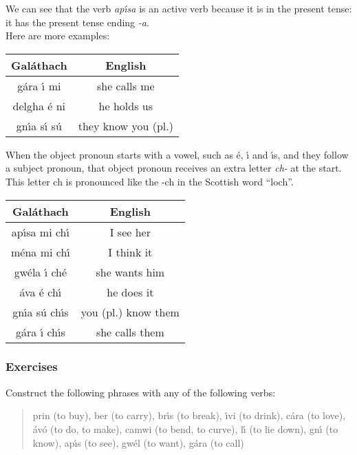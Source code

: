 We can see that the verb \textit{ap\'{\i}sa} is an active verb because it is in the present tense: it has the present tense ending \textit{-a}.\\

Here are more examples:
\begin{table}[H]
\centering
\begin{tabular}{c|c}
  \textbf{Gal\'{a}thach} & \textbf{English}\\
  \toprule
   g\'{a}ra \'{\i} mi & she calls me\\
   delgha \'{e} ni & he holds us\\
   gn\'{\i}a s\'{\i} s\'{u} & they know you (pl.)
\end{tabular}
\label{examples_verbs_vso_more_examples}
\end{table}

When the object pronoun starts with a vowel, such as \'{e}, \'{\i} and \'{\i}s, and they follow a subject pronoun, that object pronoun receives an extra letter \textit{ch-} at the start. This letter ch is pronounced like the -ch in the Scottish word ``loch''.
\begin{table}[H]
\centering
\begin{tabular}{c|c}
  \textbf{Gal\'{a}thach} & \textbf{English}\\
  \toprule
  ap\'{\i}sa mi ch\'{\i} & I see her\\
  m\'{e}na mi ch\'{\i} & I think it\\
  gw\'{e}la \'{\i} ch\'{e} & she wants him\\
  \'{a}va \'{e} ch\'{\i} & he does it\\
  gn\'{\i}a s\'{u} ch\'{\i}s & you (pl.) know them\\
  g\'{a}ra \'{\i} ch\'{\i}s & she calls them
\end{tabular}
\label{examples_verbs_vso_extra_ch}
\end{table}

\newpage
\subsubsection{Exercises}

Construct the following phrases with any of the following verbs:\\

\begin{quote}
prin (to buy), ber (to carry), br\'{\i}s (to break), \'{\i}vi (to drink), c\'{a}ra (to love), \'{a}v\'{o} (to do, to make), camwi (to bend, to curve), l\'{\i} (to lie down), gn\'{\i} (to know), ap\'{\i}s (to see), gw\'{e}l (to want), g\'{a}ra (to call)
\end{quote}

